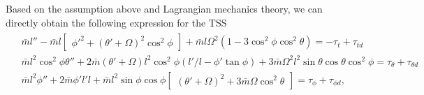 \documentclass[3p]{elsarticle}
\theoremstyle{plain}
\theoremstyle{remark}
\begin{document}
Based on the assumption above and Lagrangian mechanics theory, we can directly obtain the following expression for the TSS~\cite{Sun2014304,Mantellato2015}
\begin{align}
\begin{split}
&\bar m l''-\bar m l\begin{bmatrix}\phi'^2+(\theta'+\Omega)^2\cos^2\phi\end{bmatrix}+\bar m l\Omega^2(1-3\cos^2\phi\cos^2\theta)=-\tau_t+\tau_{td}\\
&\bar m l^2\cos^2\phi\theta''+2\bar m (\theta'+\Omega)l^2\cos^2\phi(l'/l-\phi'\tan\phi)+3\bar m \Omega^2l^2\sin\theta\cos\theta\cos^2\phi=\tau_\theta+\tau_{\theta d}\\
&\bar m l^2\phi''+2\bar m \phi'l'l+\bar m l^2\sin\phi\cos\phi\begin{bmatrix}(\theta'+\Omega)^2+3\bar m \Omega\cos^2\theta\end{bmatrix}=\tau_\phi+\tau_{\phi d},\label{eq:dynamics 1}
\end{split}
\end{align}
\end{document}

